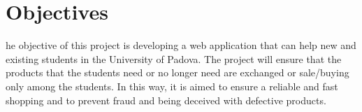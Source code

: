 \section{Objectives}


he objective of this project is developing a web application that can help new and existing students in the University of Padova. The project will ensure that the products that the students need or no longer need are exchanged or sale/buying only among the students. In this way, it is aimed to ensure a reliable and fast shopping and to prevent fraud and being deceived with defective products.